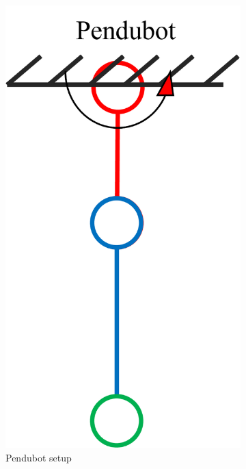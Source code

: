 \begin{figure}[htbp]
    \centering
    \begin{subfigure}[b]{0.2\textwidth}
        \includegraphics[width=\textwidth]{figures/pendubot_explained.png}
        \caption{Pendubot setup}
        \label{pendubot_explained}
    \end{subfigure}
    \begin{subfigure}[b]{0.2\textwidth}

\end{subfigure}
\end{figure}
